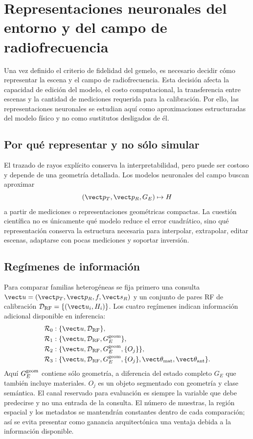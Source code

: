 \chapter{Representaciones neuronales del entorno y del campo de radiofrecuencia}
\label{ch:latent_env}

Una vez definido el criterio de fidelidad del gemelo, es necesario decidir cómo representar
la escena y el campo de radiofrecuencia. Esta decisión afecta la capacidad de edición del
modelo, el costo computacional, la transferencia entre escenas y la cantidad de mediciones
requerida para la calibración. Por ello, las representaciones neuronales se estudian aquí
como aproximaciones estructuradas del modelo físico y no como sustitutos desligados de él.

\section{Por qué representar y no sólo simular}

El trazado de rayos explícito conserva la interpretabilidad, pero puede ser costoso y depende de una geometría detallada. Los modelos neuronales del campo buscan aproximar
\begin{equation}
(\vect p_T,\vect p_R,G_E)\mapsto H
\end{equation}
a partir de mediciones o representaciones geométricas compactas. La cuestión científica no es únicamente qué modelo reduce el error cuadrático, sino qué representación conserva la estructura necesaria para interpolar, extrapolar, editar escenas, adaptarse con pocas mediciones y soportar inversión.

\section{Regímenes de información}

Para comparar familias heterogéneas se fija primero una consulta $\vect u=(\vect p_T,\vect p_R,f,\vect s_R)$ y un conjunto de pares RF de calibración $\mathcal D_{\rm RF}=\{(\vect u_i,H_i)\}$. Los cuatro regímenes indican información adicional disponible en inferencia:
\begin{align}
\mathcal R_0 &: \{\vect u,\mathcal D_{\rm RF}\},\\
\mathcal R_1 &: \{\vect u,\mathcal D_{\rm RF},G_E^{\rm geom}\},\\
\mathcal R_2 &: \{\vect u,\mathcal D_{\rm RF},G_E^{\rm geom},\{O_j\}\},\\
\mathcal R_3 &: \{\vect u,\mathcal D_{\rm RF},G_E^{\rm geom},\{O_j\},
\vect\theta_{\rm mat},\vect\theta_{\rm ant}\}.
\end{align}
Aquí $G_E^{\rm geom}$ contiene sólo geometría, a diferencia del estado
completo $G_E$ que también incluye materiales. $O_j$ es un objeto segmentado con geometría y clase semántica. El canal reservado para evaluación es siempre la variable que debe predecirse y no una entrada de la consulta. El número de muestras, la región espacial y los metadatos se mantendrán constantes dentro de cada comparación; así se evita presentar como ganancia arquitectónica una ventaja debida a la información disponible.

